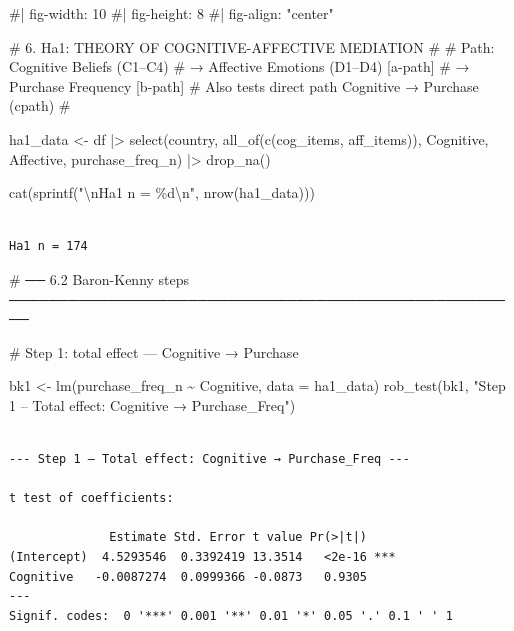 \documentclass[
  letterpaper,
  DIV=11,
  numbers=noendperiod]{scrartcl}
\newenvironment{Shaded}{\begin{snugshade}}{\end{snugshade}}
\newcommand{\AttributeTok}[1]{\textcolor[rgb]{0.40,0.45,0.13}{#1}}
\newcommand{\CommentTok}[1]{\textcolor[rgb]{0.37,0.37,0.37}{#1}}
\newcommand{\FunctionTok}[1]{\textcolor[rgb]{0.28,0.35,0.67}{#1}}
\newcommand{\NormalTok}[1]{\textcolor[rgb]{0.00,0.23,0.31}{#1}}
\newcommand{\OtherTok}[1]{\textcolor[rgb]{0.00,0.23,0.31}{#1}}
\newcommand{\SpecialCharTok}[1]{\textcolor[rgb]{0.37,0.37,0.37}{#1}}
\newcommand{\StringTok}[1]{\textcolor[rgb]{0.13,0.47,0.30}{#1}}
\begin{document}
\begin{Shaded}
\begin{Highlighting}[]
\CommentTok{\#| fig{-}width: 10}
\CommentTok{\#| fig{-}height: 8}
\CommentTok{\#| fig{-}align: "center"}


\CommentTok{\# 6.  Ha1: THEORY OF COGNITIVE{-}AFFECTIVE MEDIATION}
\CommentTok{\#}
\CommentTok{\#  Path:  Cognitive Beliefs (C1–C4)}
\CommentTok{\#            → Affective Emotions (D1–D4)   [a{-}path]}
\CommentTok{\#            → Purchase Frequency           [b{-}path]}
\CommentTok{\#  Also tests direct path Cognitive → Purchase (c\textquotesingle{}{-}path)}
\CommentTok{\# }

\NormalTok{ha1\_data }\OtherTok{\textless{}{-}}\NormalTok{ df }\SpecialCharTok{|\textgreater{}}
  \FunctionTok{select}\NormalTok{(country, }\FunctionTok{all\_of}\NormalTok{(}\FunctionTok{c}\NormalTok{(cog\_items, aff\_items)),}
\NormalTok{         Cognitive, Affective, purchase\_freq\_n) }\SpecialCharTok{|\textgreater{}}
  \FunctionTok{drop\_na}\NormalTok{()}

\FunctionTok{cat}\NormalTok{(}\FunctionTok{sprintf}\NormalTok{(}\StringTok{"}\SpecialCharTok{\textbackslash{}n}\StringTok{Ha1 n = \%d}\SpecialCharTok{\textbackslash{}n}\StringTok{"}\NormalTok{, }\FunctionTok{nrow}\NormalTok{(ha1\_data)))}
\end{Highlighting}
\end{Shaded}

\begin{verbatim}

Ha1 n = 174
\end{verbatim}

\begin{Shaded}
\begin{Highlighting}[]
\CommentTok{\# ── 6.2  Baron{-}Kenny steps ────────────────────────────────────────────────────}

\CommentTok{\# Step 1: total effect — Cognitive → Purchase}

\NormalTok{bk1 }\OtherTok{\textless{}{-}} \FunctionTok{lm}\NormalTok{(purchase\_freq\_n }\SpecialCharTok{\textasciitilde{}}\NormalTok{ Cognitive, }\AttributeTok{data =}\NormalTok{ ha1\_data)}
\FunctionTok{rob\_test}\NormalTok{(bk1, }\StringTok{"Step 1 – Total effect: Cognitive → Purchase\_Freq"}\NormalTok{)}
\end{Highlighting}
\end{Shaded}

\begin{verbatim}

--- Step 1 – Total effect: Cognitive → Purchase_Freq ---

t test of coefficients:

              Estimate Std. Error t value Pr(>|t|)    
(Intercept)  4.5293546  0.3392419 13.3514   <2e-16 ***
Cognitive   -0.0087274  0.0999366 -0.0873   0.9305    
---
Signif. codes:  0 '***' 0.001 '**' 0.01 '*' 0.05 '.' 0.1 ' ' 1
\end{verbatim}
\end{document}
